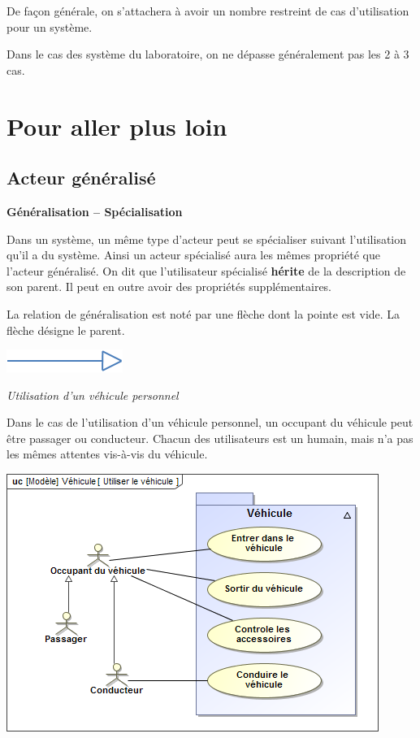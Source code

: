 \documentclass[11pt,oneside]{article}
\begin{document}
\begin{rem}
De façon générale, on s'attachera à avoir un nombre restreint de cas d'utilisation pour un système. 

Dans le cas des système du laboratoire, on ne dépasse généralement pas les 2 à 3 cas. 
\end{rem}

\section{Pour aller plus loin}

\subsection{Acteur généralisé}
\begin{defi}
\textbf{Généralisation -- Spécialisation}

Dans un système, un même type d'acteur peut se spécialiser suivant l'utilisation qu'il a du système. Ainsi un acteur spécialisé aura les mêmes propriété que l'acteur généralisé. On dit que l'utilisateur spécialisé \textbf{hérite} de la description de son parent. Il peut en outre avoir des propriétés supplémentaires. 

\begin{minipage}[c]{.6\linewidth}
La relation de généralisation est noté par une flèche dont la pointe est vide. La flèche désigne le parent. 
\end{minipage} \hfill
\begin{minipage}[c]{.3\linewidth}
\begin{center}
\includegraphics[width=.7\textwidth]{png/gene}
\end{center}
\end{minipage} 

\end{defi}


\begin{exemple}
\textit{Utilisation d'un véhicule personnel}

Dans le cas de l'utilisation d'un véhicule personnel, un occupant du véhicule peut être passager ou conducteur. Chacun des utilisateurs est un humain, mais n'a pas les mêmes attentes vis-à-vis du véhicule. 

\begin{center}
\includegraphics[width=.5\textwidth]{png/uc_utiliser}
\end{center}

\end{exemple}
\end{document}
